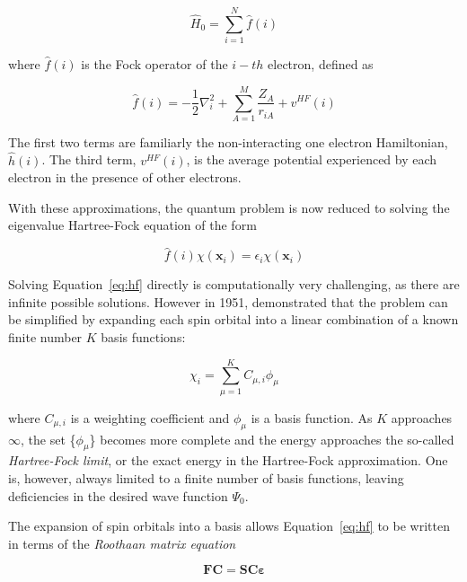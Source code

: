 \begin{equation}
\hat{H}_0 = \sum_{i=1}^N \hat{f}(i)
\end{equation}

\noindent where $\hat{f}(i)$ is the Fock operator of the $i-th$ electron, defined as

\begin{equation}
  \hat{f}(i) = -\frac{1}{2}\nabla^2_i + \sum_{A=1}^M\frac{Z_A}{r_{iA}} + v^{HF}(i)
\end{equation}

\noindent The first two terms are familiarly the non-interacting one electron Hamiltonian, $\hat{h}(i)$. The third term, $v^{HF}(i)$, is the average potential experienced by each electron in the presence of other electrons.

With these approximations, the quantum problem is now reduced to solving the eigenvalue Hartree-Fock equation of the form

\begin{equation}
\hat{f}(i)\chi(\mathbf{x}_i) = \epsilon_i\chi(\mathbf{x}_i)
\label{eq:hf}
\end{equation}

Solving Equation~\ref{eq:hf} directly is computationally very challenging, as there are infinite possible solutions.  However in 1951, \citet{Roothaan1951} demonstrated that the problem can be simplified by expanding each spin orbital into a linear combination of a known finite number $K$ basis functions:

\begin{equation}
\chi_i = \sum_{\mu=1}^K C_{\mu,i}\phi_{\mu}
\end{equation}

\noindent where $C_{\mu,i}$ is a weighting coefficient and $\phi_{\mu}$ is a basis function. As $K$ approaches $\infty$, the set \{$\phi_{\mu}$\} becomes more complete and the energy approaches the so-called \emph{Hartree-Fock limit}, or the exact energy in the Hartree-Fock approximation. One is, however, always limited to a finite number of basis functions, leaving deficiencies in the desired wave function $\Psi_0$.

The expansion of spin orbitals into a basis allows Equation~\ref{eq:hf} to be written in terms of the \emph{Roothaan matrix equation}

\begin{equation}
\mathbf{F}\mathbf{C} = \mathbf{S}\mathbf{C}\mathbf{\varepsilon}
\label{eq:roothan}
\end{equation}

